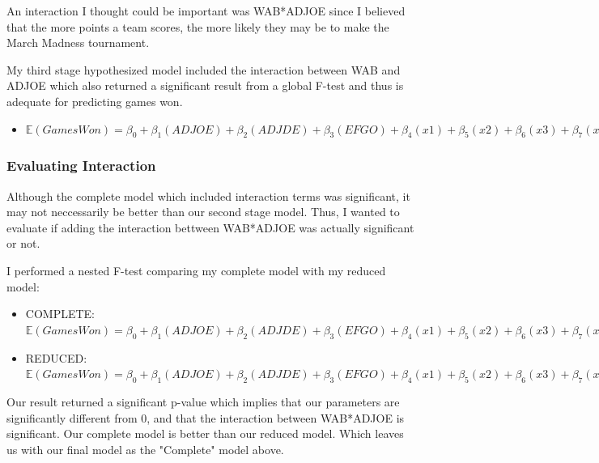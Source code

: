 \documentclass{article}
\begin{document}
An interaction I thought could be important was WAB*ADJOE since I believed that the more points a team scores, the more likely they may be to make the March Madness tournament. 

My third stage hypothesized model included the interaction between WAB and ADJOE which also returned a significant result from a global F-test and thus is adequate for predicting games won. 


\begin{itemize}

  \item $\mathbb{E}(Games Won) = \beta_{0} + \beta_{1}(ADJOE) + \beta_{2}(ADJDE) + \beta_{3}(EFGO) + \beta_{4}(x1) + \beta_{5}(x2) + \beta_{6}(x3) + \beta_{7}(x4) + \beta_{8}(ADJOE*x1) + \beta_{9}(ADJOE * x2) + \beta_{10}(ADJOE * x3) + \beta_{11}(ADJOE *x4)$ 
  
\end{itemize}


\subsubsection*{Evaluating Interaction}

Although the complete model which included interaction terms was significant, it may not neccessarily be better than our second stage model. Thus, I wanted to evaluate if adding the interaction bettween WAB*ADJOE was actually significant or not.

I performed a nested F-test comparing my complete model with my reduced model:

\begin{itemize}

  \item COMPLETE: $\mathbb{E}(Games Won) = \beta_{0} + \beta_{1}(ADJOE) + \beta_{2}(ADJDE) + \beta_{3}(EFGO) + \beta_{4}(x1) + \beta_{5}(x2) + \beta_{6}(x3) + \beta_{7}(x4) + \beta_{8}(ADJOE*x1) + \beta_{9}(ADJOE * x2) + \beta_{10}(ADJOE * x3) + \beta_{11}(ADJOE *x4)$ 

  \item REDUCED: $\mathbb{E}(Games Won) = \beta_{0} + \beta_{1}(ADJOE) + \beta_{2}(ADJDE) + \beta_{3}(EFGO) + \beta_{4}(x1) + \beta_{5}(x2) + \beta_{6}(x3) + \beta_{7}(x4)$ 
  
\end{itemize}

Our result returned a significant p-value which implies that our parameters are significantly different from 0, and that the interaction between WAB*ADJOE is significant. Our complete model is better than our reduced model. Which leaves us with our final model as the "Complete" model above. 
\end{document}
